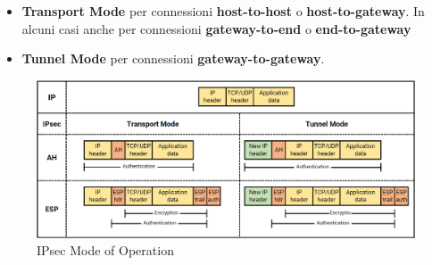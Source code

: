 \begin{theorem}\label{def:ipsecmodesel}
\begin{itemize}
    \item \textbf{Transport Mode} per connessioni \textbf{host-to-host} o \textbf{host-to-gateway}. In alcuni casi anche per connessioni \textbf{gateway-to-end} o \textbf{end-to-gateway}
    \item \textbf{Tunnel Mode} per connessioni \textbf{gateway-to-gateway}.
\end{itemize}
\end{theorem}
\begin{figure}[h]
    \centering
    \includegraphics{image/ipsecmode.png}
    \caption{IPsec Mode of Operation}
    \label{fig:my_label}
\end{figure}

